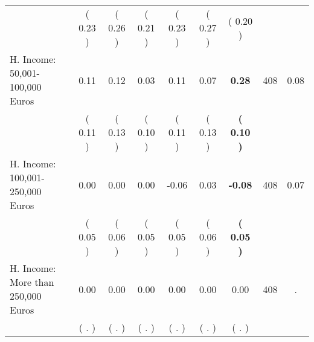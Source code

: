 \begin{tabular}{lcccccccc}
 & (     0.23 ) & (     0.26 ) & (     0.21 ) & (     0.23 ) & (     0.27 ) & (     0.20 ) & \\
H. Income: 50,001-100,000 Euros &      0.11 &      0.12 &      0.03 &      0.11 &      0.07 & \textbf{     0.28} & 408 &       0.08 \\ 
 & (     0.11 ) & (     0.13 ) & (     0.10 ) & (     0.11 ) & (     0.13 ) & \textbf{(     0.10 )} & \\
H. Income: 100,001-250,000 Euros &      0.00 &      0.00 &      0.00 &     -0.06 &      0.03 & \textbf{    -0.08} & 408 &       0.07 \\ 
 & (     0.05 ) & (     0.06 ) & (     0.05 ) & (     0.05 ) & (     0.06 ) & \textbf{(     0.05 )} & \\
H. Income: More than 250,000 Euros &      0.00 &      0.00 &      0.00 &      0.00 &      0.00 &      0.00 & 408 &          . \\ 
 & (        . ) & (        . ) & (        . ) & (        . ) & (        . ) & (        . ) & \\
\bottomrule
\end{tabular}

